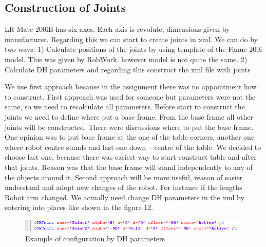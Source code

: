 \subsection{Construction of Joints}
LR Mate 200iB has six axes. Each axis is revolute, dimensions given by manufacturer. Regarding this we can start to create joints in xml. We can do by two ways:
1)	Calculate positions of the joints by using template of the Fanuc 200i model. This was given by RobWork, however model is not quite the same.
2)	Calculate DH parameters and regarding this construct the xml file with joints

We use first approach because in the assignment there was no appointment how to construct. First approach was used for someone but parameters were not the same, so we need to recalculate all parameters. Before start to construct the joints we need to define where put a base frame. From the base frame all other joints will be constructed. There were discussions where to put the base frame. One opinion was to put base frame at the one of the table corners, another one where robot centre stands and last one down – centre of the table. We decided to choose last one, because there was easiest way to start construct table and after that joints. Reason was that the base frame will stand independently to any of the objects around it.
Second approach will be more useful, reason of easier understand and adopt new changes of the robot. For instance if the lengths Robot arm changed. We actually need change DH parameters in the xml by entering into places like shown in the figure 12. 

\begin{figure}[H]
  \centering
  \includegraphics[scale= 0.65]{source/DHParameters.png}
  \caption{Example of configuration by DH parameters}
  \label{fig:DHParameters}
\end{figure}




